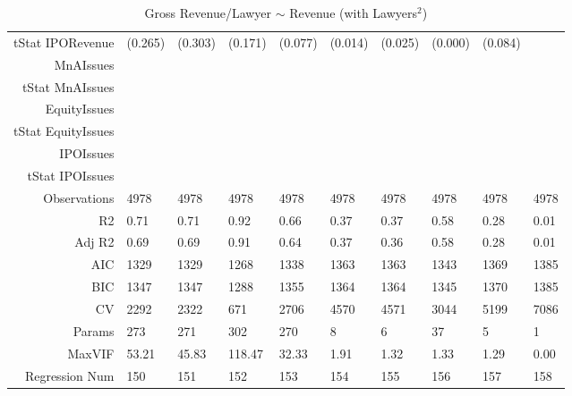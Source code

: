 \begin{table}[ht]
\begin{tabular}{rlllllllll}
  tStat IPORevenue & (0.265) & (0.303) & (0.171) & (0.077) & (0.014) & (0.025) & (0.000) & (0.084) &  \\ 
  MnAIssues &  &  &  &  &  &  &  &  &  \\ 
  tStat MnAIssues &  &  &  &  &  &  &  &  &  \\ 
  EquityIssues &  &  &  &  &  &  &  &  &  \\ 
  tStat EquityIssues &  &  &  &  &  &  &  &  &  \\ 
  IPOIssues &  &  &  &  &  &  &  &  &  \\ 
  tStat IPOIssues &  &  &  &  &  &  &  &  &  \\ 
  Observations & 4978 & 4978 & 4978 & 4978 & 4978 & 4978 & 4978 & 4978 & 4978 \\ 
  R2 & 0.71 & 0.71 & 0.92 & 0.66 & 0.37 & 0.37 & 0.58 & 0.28 & 0.01 \\ 
  Adj R2 & 0.69 & 0.69 & 0.91 & 0.64 & 0.37 & 0.36 & 0.58 & 0.28 & 0.01 \\ 
  AIC & 1329 & 1329 & 1268 & 1338 & 1363 & 1363 & 1343 & 1369 & 1385 \\ 
  BIC & 1347 & 1347 & 1288 & 1355 & 1364 & 1364 & 1345 & 1370 & 1385 \\ 
  CV & 2292 & 2322 & 671 & 2706 & 4570 & 4571 & 3044 & 5199 & 7086 \\ 
  Params & 273 & 271 & 302 & 270 & 8 & 6 & 37 & 5 & 1 \\ 
  MaxVIF & 53.21 & 45.83 & 118.47 & 32.33 & 1.91 & 1.32 & 1.33 & 1.29 & 0.00 \\ 
  Regression Num & 150 & 151 & 152 & 153 & 154 & 155 & 156 & 157 & 158 \\ 
   \hline
\end{tabular}
\caption{Gross Revenue/Lawyer $\sim$ Revenue (with Lawyers$^2$)} 
\end{table}
